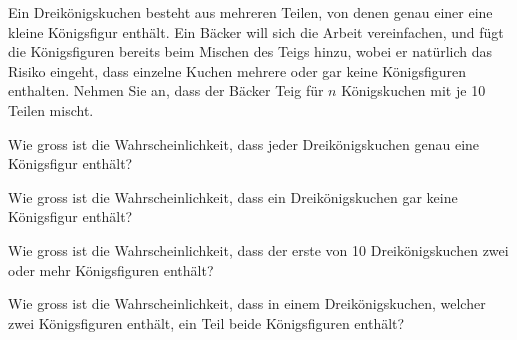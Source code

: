 Ein Dreikönigskuchen besteht aus mehreren Teilen, von denen genau einer 
eine kleine
Königsfigur enthält. Ein Bäcker will sich die Arbeit vereinfachen, und
fügt die Königsfiguren bereits beim Mischen des Teigs hinzu,
wobei er natürlich das Risiko eingeht, dass einzelne Kuchen mehrere oder
gar keine Königsfiguren enthalten. Nehmen Sie an, dass der Bäcker Teig
für $n$ Königskuchen mit je 10 Teilen mischt.
\begin{teilaufgaben}
\item Wie gross ist die Wahrscheinlichkeit, dass jeder Dreikönigskuchen genau
eine Königsfigur enthält?
\item Wie gross ist die Wahrscheinlichkeit, dass ein Dreikönigskuchen gar
keine Königsfigur enthält?
\item Wie gross ist die Wahrscheinlichkeit, dass der erste von
10 Dreikönigskuchen zwei oder mehr Königsfiguren enthält?
\item Wie gross ist die Wahrscheinlichkeit, dass in einem Dreikönigskuchen,
welcher zwei Königsfiguren enthält, ein Teil
beide Königsfiguren enthält?
\end{teilaufgaben}

